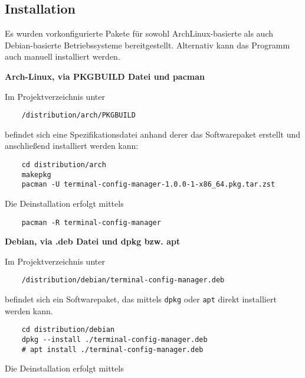 \subsection{Installation} \label{Installation}
Es wurden vorkonfigurierte Pakete für sowohl ArchLinux-basierte als auch
Debian-basierte Betriebssysteme bereitgestellt. Alternativ
kann das Programm auch manuell installiert werden.

\begin{center}
	\textbf{Arch-Linux, via PKGBUILD Datei und pacman}
\end{center}

Im Projektverzeichnis unter

\begin{verbatim}
	/distribution/arch/PKGBUILD
\end{verbatim}

befindet sich eine Spezifikationsdatei anhand derer das Softwarepaket
erstellt und anschließend installiert werden kann:

\begin{verbatim}
	cd distribution/arch
	makepkg
	pacman -U terminal-config-manager-1.0.0-1-x86_64.pkg.tar.zst
\end{verbatim}

Die Deinstallation erfolgt mittels

\begin{verbatim}
	pacman -R terminal-config-manager
\end{verbatim}

\begin{center}
	\textbf{Debian, via .deb Datei und dpkg bzw. apt}
\end{center}

Im Projektverzeichnis unter

\begin{verbatim}
	/distribution/debian/terminal-config-manager.deb
\end{verbatim}

befindet sich ein Softwarepaket, das mittels \texttt{dpkg} oder
\texttt{apt} direkt installiert werden kann.

\begin{verbatim}
	cd distribution/debian
	dpkg --install ./terminal-config-manager.deb
	# apt install ./terminal-config-manager.deb
\end{verbatim}

Die Deinstallation erfolgt mittels

